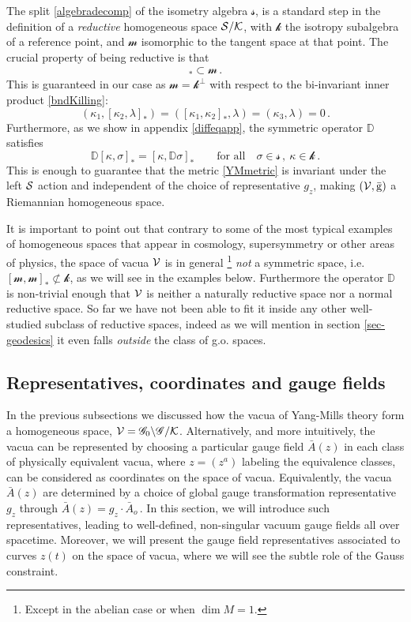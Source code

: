 \documentclass[11pt,a4paper]{article}
\def\calg{{\mathscr G}}
\def\calk{{\cal K}}
\def\calsk{\boldsymbol{\mathscr k}}
\def\calsm{{\boldsymbol{\mathscr m}}}
\def\cals{{\cal S}}
\def\calss{{\boldsymbol{\mathscr s}}}
\def\calv{{\cal V}}
\def\rg{{\mathrm{g}}}
\def\Dperp{{\mathbb{D}}}
\begin{document}
    The split \eqref{algebradecomp} of the isometry algebra $\calss$, is a standard step in the definition of a {\it reductive} homogeneous space $\cals/\calk$,  with $\calsk$ the isotropy subalgebra of a reference point, and $\calsm$ isomorphic to the tangent space at that point. The crucial property of being reductive is that 
    \begin{align}
    [\calsk,\calsm]_*\subset\calsm\,.\label{reductive property}
    \end{align}
    This is guaranteed in our case as $\calsm=\calsk^\perp$ with respect to the bi-invariant inner product \eqref{bndKilling}:
    \begin{equation}
    (\kappa_1,[\kappa_2,\lambda]_*)=([\kappa_1,\kappa_2]_*,\lambda)=(\kappa_3,\lambda)=0\,.
    \end{equation} Furthermore, as we show in appendix \ref{diffeqapp}, the symmetric operator $\Dperp$ satisfies
    \begin{equation}
    \Dperp[\kappa,\sigma]_*=[\kappa,\Dperp\sigma]_*\qquad\mbox{for all}\quad \sigma\in\calss\,,\ \kappa\in\calsk\,.\label{equivar}
    \end{equation} This is enough to guarantee that the metric \eqref{YMmetric} is invariant under the left $\cals$ action and independent of the choice of representative $g_z$, making $(\calv,\bar{\rg})$ a Riemannian homogeneous space.
    
    It is important to point out that contrary to some of the most typical examples of homogeneous spaces that appear in cosmology, supersymmetry or other areas of physics, the space of vacua $\calv$ is in general \footnote{Except in the abelian case or when $\dim M=1$.} {\it not} a symmetric space, i.e. $[\calsm,\calsm]_*\not\subset \calsk$, as we will see in the examples below. Furthermore the operator $\Dperp$ is non-trivial enough that $\calv$ is neither a naturally reductive space nor a normal reductive space. So far we have not been able to fit it inside any other well-studied subclass of reductive spaces, indeed as we will mention in section \ref{sec-geodesics} it even falls {\it outside} the class of g.o. \!spaces.
    
    
  \subsection{Representatives, coordinates and gauge fields}\label{secreps}
  In the previous subsections we discussed how the vacua of Yang-Mills theory form a homogeneous space, $\calv=\calg_0\backslash\calg/\calk$. Alternatively, and more intuitively, the vacua can be represented by choosing a particular gauge field  $\bar A(z)$ in each class of physically equivalent vacua, where $z=(z^a)$ labeling the equivalence classes, can be considered as coordinates on the space of vacua. Equivalently, the vacua $\bar A(z)$ are determined by a choice of global gauge transformation representative $g_z$ through $\bar A(z)=g_z\cdot \bar A_o$\,. 
  In this section, we will introduce such representatives, leading to well-defined, non-singular vacuum gauge fields all over spacetime. Moreover, we will present the gauge field representatives associated to curves $z(t)$ on the space of vacua, where  we will see the subtle role of the Gauss constraint.
 
\end{document}
